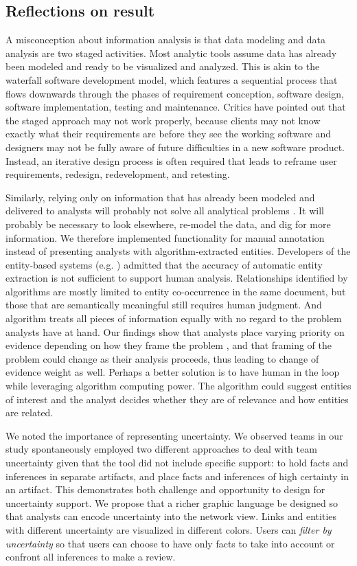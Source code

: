 \subsection{Reflections on result}\label{reflections-on-result}

A misconception about information analysis is that data modeling and
data analysis are two staged activities. Most analytic tools assume data
has already been modeled and ready to be visualized and analyzed. This
is akin to the waterfall software development model, which features a
sequential process that flows downwards through the phases of
requirement conception, software design, software implementation,
testing and maintenance. Critics have pointed out that the staged
approach may not work properly, because clients may not know exactly
what their requirements are before they see the working software and
designers may not be fully aware of future difficulties in a new
software product. Instead, an iterative design process is often required
that leads to reframe user requirements, redesign, redevelopment, and
retesting.

Similarly, relying only on information that has already been modeled and
delivered to analysts will probably not solve all analytical problems
\autocite{Heuer1999}. It will probably be necessary to look elsewhere, re-model
the data, and dig for more information. We therefore implemented functionality
for manual annotation instead of presenting analysts with algorithm-extracted
entities. Developers of the entity-based systems (e.g. \autocite{Gorg2014})
admitted that the accuracy of automatic entity extraction is not sufficient to
support human analysis. Relationships identified by algorithms are mostly
limited to entity co-occurrence in the same document, but those that are
semantically meaningful still requires human judgment. And algorithm treats all
pieces of information equally with no regard to the problem analysts have at
hand. Our findings show that analysts place varying priority on evidence
depending on how they frame the problem \autocite{Heuer1999}, and that framing
of the problem could change as their analysis proceeds, thus leading to change
of evidence weight as well. Perhaps a better solution is to have human in the
loop while leveraging algorithm computing power. The algorithm could suggest
entities of interest and the analyst decides whether they are of relevance and
how entities are related.


We noted the importance of representing uncertainty. We observed teams
in our study spontaneously employed two different approaches to deal
with team uncertainty given that the tool did not include specific
support: to hold facts and inferences in separate artifacts, and place
facts and inferences of high certainty in an artifact. This demonstrates
both challenge and opportunity to design for uncertainty support. We
propose that a richer graphic language be designed so that analysts can
encode uncertainty into the network view. Links and entities with
different uncertainty are visualized in different colors. Users can
\emph{filter by uncertainty} so that users can choose to have only facts
to take into account or confront all inferences to make a review.

